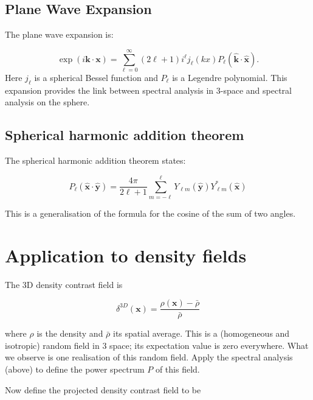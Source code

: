 \documentclass[11pt]{article}
\begin{document}
\subsection{Plane Wave Expansion}

The plane wave expansion is:

\begin{equation}
\exp(i \boldsymbol{k} \cdot \boldsymbol{x}) = \sum_{\ell=0}^\infty (2 \ell +1) i^{\ell} j_{\ell}(kx) P_{\ell}(\boldsymbol{\hat{k}} \cdot \boldsymbol{\hat{x}}).
\end{equation}
Here $j_{\ell}$ is a spherical Bessel function and $P_{\ell}$ is a Legendre polynomial. This expansion provides the link between spectral analysis in 3-space and spectral analysis on the sphere.

\subsection{Spherical harmonic addition theorem}

The spherical harmonic addition theorem states:

\begin{equation}
P_{\ell}(\boldsymbol{\hat{x}} \cdot \boldsymbol{\hat{y}}) = \frac{4 \pi}{2 \ell + 1}\sum_{m=-\ell}^{\ell} Y_{\ell m}(\boldsymbol{\hat{y}}) Y_{\ell m}^{\ast}(\boldsymbol{\hat{x}})
\end{equation}

\noindent This is a generalisation of the formula for the cosine of the sum of two angles.

\section{Application to density fields}

The 3D density contrast field is

\begin{equation}
\delta^{3D}(\boldsymbol{x}) = \frac{\rho(\boldsymbol{x}) - \bar{\rho}}{\bar{\rho}}
\end{equation}

\noindent where $\rho$ is the density and $\bar{\rho}$ its spatial average. This is a (homogeneous and isotropic) random field in 3 space; its expectation value is zero everywhere. What we observe is one realisation of this random field. Apply the spectral analysis (above) to define the power spectrum $P$ of this field.

Now define the projected density contrast field to be
\end{document}
